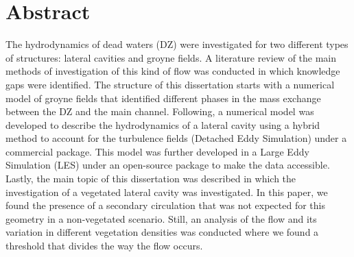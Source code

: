 \chapter*{Abstract}
The hydrodynamics of dead waters (DZ) were investigated for two different types of structures: lateral cavities and groyne fields. A literature review of the main methods of investigation of this kind of flow was conducted in which knowledge gaps were identified. The structure of this dissertation starts with a numerical model of groyne fields that identified different phases in the mass exchange between the DZ and the main channel. Following, a numerical model was developed to describe the hydrodynamics of a lateral cavity using a hybrid method to account for the turbulence fields (Detached Eddy Simulation) under a commercial package. This model was further developed in a Large Eddy Simulation (LES) under an open-source package to make the data accessible. Lastly, the main topic of this dissertation was described in which the investigation of a vegetated lateral cavity was investigated. In this paper, we found the presence of a secondary circulation that was not expected for this geometry in a non-vegetated scenario. Still, an analysis of the flow and its variation in different vegetation densities was conducted where we found a threshold that divides the way the flow occurs.